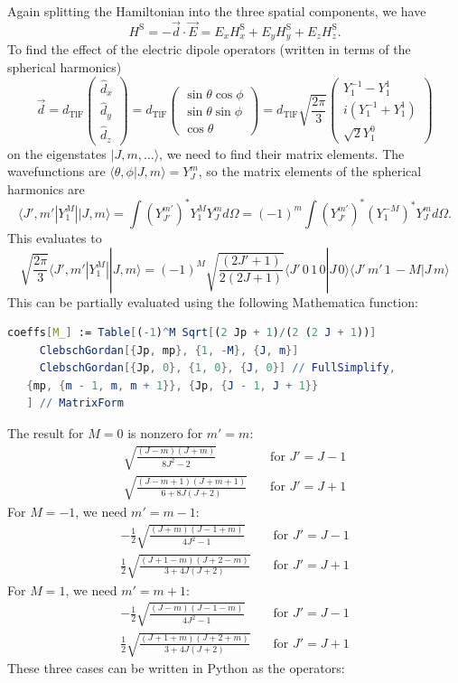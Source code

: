 Again splitting the Hamiltonian into the three spatial components, we have
%
$$H^\text{S}=-\vec d\cdot\vec E
=E_xH^\text{S}_x+E_yH^\text{S}_y+E_zH^\text{S}_z.$$
%
To find the effect of the electric dipole operators (written in terms of the spherical harmonics)
%
$$\vec d
=d_\text{TlF}\begin{pmatrix}\hat d_x\\\hat d_y\\\hat d_z\end{pmatrix}
=d_\text{TlF}\begin{pmatrix}\sin\theta\cos\phi\\\sin\theta\sin\phi\\\cos\theta\end{pmatrix}
=d_\text{TlF}\sqrt{\frac{2\pi}{3}}\begin{pmatrix}
Y_1^{-1}-Y_1^1\\
i(Y_1^{-1}+Y_1^1)\\
\sqrt2Y_1^0\end{pmatrix}$$
%
on the eigenstates $|J,m,\ldots\rangle$, we need to find their matrix elements. The wavefunctions are $\langle\theta,\phi|J,m\rangle=Y_J^m$, so the matrix elements of the spherical harmonics are
%
$$
\langle J',m'|Y_1^M||J,m\rangle
=\int(Y_{J'}^{m'})^*Y_1^MY_J^md\Omega
=(-1)^{m}\int(Y_{J'}^{m'})^*(Y_1^{-M})^*Y_J^md\Omega.
$$
%
This evaluates to
%
$$
\sqrt{\frac{2\pi}{3}}
\langle J',m'|Y_1^M||J,m\rangle
=(-1)^{M}
 \sqrt{\frac{(2 J' + 1)}{2(2 J + 1)}}
    \langle J' \, 0 \, 1 \, 0 | J \, 0 \rangle
    \langle J' \, m' \, 1 \, -M | J \, m \rangle
$$
%
This can be partially evaluated using the following Mathematica function:

\begin{lstlisting}[language=Mathematica]
coeffs[M_] := Table[(-1)^M Sqrt[(2 Jp + 1)/(2 (2 J + 1))]
     ClebschGordan[{Jp, mp}, {1, -M}, {J, m}]
     ClebschGordan[{Jp, 0}, {1, 0}, {J, 0}] // FullSimplify,
   {mp, {m - 1, m, m + 1}}, {Jp, {J - 1, J + 1}}
   ] // MatrixForm
\end{lstlisting}

The result for $M=0$ is nonzero for $m'=m$:
%
$$
\begin{aligned}
\sqrt{\frac{(J-m)(J+m)}{8J^2-2}}&\quad\text{for $J'=J-1$}\\
\sqrt{\frac{(J-m+1)(J+m+1)}{6+8J(J+2)}}&\quad\text{for $J'=J+1$}
\end{aligned}
$$
%
For $M=-1$, we need $m'=m-1$:
%
$$
\begin{aligned}
-\frac{1}{2}
\sqrt{\frac{(J+m)(J-1+m)}{4J^2-1}}&\quad\text{for $J'=J-1$}\\
\frac{1}{2}
\sqrt{\frac{(J+1-m)(J+2-m)}{3+4J(J+2)}}&\quad\text{for $J'=J+1$}
\end{aligned}
$$
%
For $M=1$, we need $m'=m+1$:
%
$$
\begin{aligned}
-\frac{1}{2}
\sqrt{\frac{(J-m)(J-1-m)}{4J^2-1}}&\quad\text{for $J'=J-1$}\\
\frac{1}{2}
\sqrt{\frac{(J+1+m)(J+2+m)}{3+4J(J+2)}}&\quad\text{for $J'=J+1$}
\end{aligned}
$$
%
These three cases can be written in Python as the operators:

